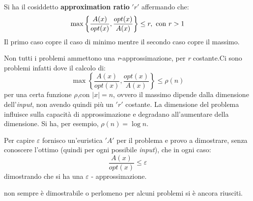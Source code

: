 								\begin{definizione}
									Si ha il cosiddetto \textbf{approximation ratio} $ 'r' $ affermando che:
									\[\max\left\{\frac{A(x)}{opt(x)},\frac{opt(x)}{A(x)}\right\}\leq r,\mbox{
											\textnormal{con} }r>1\] 
										Il primo caso copre il caso di minimo mentre il secondo caso copre il massimo.
										\begin{nota}
											Non tutti i problemi ammettono una \textit{r}-approssimazione, per
											\textit{r} costante.Ci sono problemi infatti dove il calcolo di:
											\[\max\left\{\frac{A(x)}{opt(x)},\frac{opt(x)}{A(x)}\right\}\leq \rho(n)\]
											per una certa funzione $\rho$,con $|x|=n$,
											ovvero il massimo dipende dalla
											dimensione dell'\textit{input}, non avendo quindi più un $ 'r' $ costante. La dimensione del
											problema influisce sulla capacità di approssimazione e degradano all'aumentare
											della dimensione. Si ha, per esempio, $\rho(n)=\log n$.
										\end{nota}
										\end{definizione}
										Per capire $\varepsilon$ fornisco un'euristica $ 'A' $ per il problema e provo a
										dimostrare, senza conoscere l'ottimo (quindi per ogni possibile \textit{input}), che in
										ogni caso:
										\[\frac{A(x)}{opt(x)}\leq \varepsilon\]
										dimostrando che si ha una $\varepsilon$ - approssimazione.
										\begin{nota}
											non sempre è
											dimostrabile o perlomeno per alcuni problemi si è ancora riusciti.
										\end{nota}
